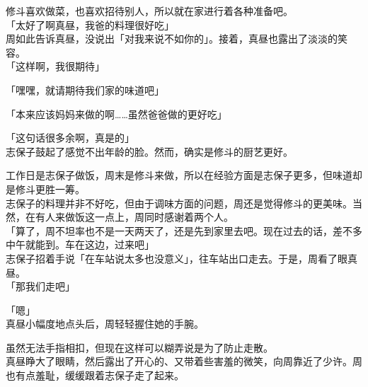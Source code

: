 修斗喜欢做菜，也喜欢招待别人，所以就在家进行着各种准备吧。\\

「太好了啊真昼，我爸的料理很好吃」\\

周如此告诉真昼，没说出「对我来说不如你的」。接着，真昼也露出了淡淡的笑容。\\

「这样啊，我很期待」

「嘿嘿，就请期待我们家的味道吧」

「本来应该妈妈来做的啊……虽然爸爸做的更好吃」

「这句话很多余啊，真是的」\\

志保子鼓起了感觉不出年龄的脸。然而，确实是修斗的厨艺更好。

工作日是志保子做饭，周末是修斗来做，所以在经验方面是志保子更多，但味道却是修斗更胜一筹。\\

志保子的料理并非不好吃，但由于调味方面的问题，周还是觉得修斗的更美味。当然，在有人来做饭这一点上，周同时感谢着两个人。\\

「算了，周不坦率也不是一天两天了，还是先到家里去吧。现在过去的话，差不多中午就能到。车在这边，过来吧」\\

志保子招着手说「在车站说太多也没意义」，往车站出口走去。于是，周看了眼真昼。\\

「那我们走吧」

「嗯」\\

真昼小幅度地点头后，周轻轻握住她的手腕。

虽然无法手指相扣，但现在这样可以糊弄说是为了防止走散。\\

真昼睁大了眼睛，然后露出了开心的、又带着些害羞的微笑，向周靠近了少许。周也有点羞耻，缓缓跟着志保子走了起来。
